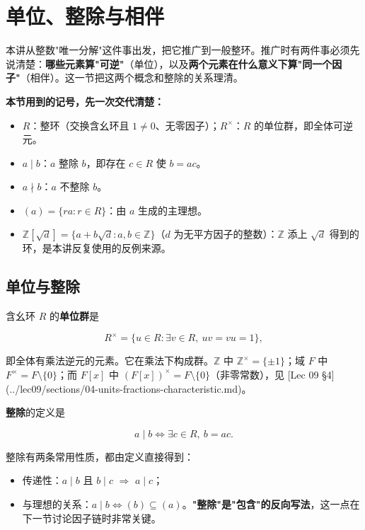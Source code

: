 \section{单位、整除与相伴}


本讲从整数"唯一分解"这件事出发，把它推广到一般整环。推广时有两件事必须先说清楚：\textbf{哪些元素算"可逆"}（单位），以及\textbf{两个元素在什么意义下算"同一个因子"}（相伴）。这一节把这两个概念和整除的关系理清。

\textbf{本节用到的记号，先一次交代清楚：}

\begin{itemize}
\item $R$：整环（交换含幺环且 $1\ne0$、无零因子）；$R^\times$：$R$ 的单位群，即全体可逆元。
\item $a\mid b$：$a$ 整除 $b$，即存在 $c\in R$ 使 $b=ac$。
\item $a\nmid b$：$a$ 不整除 $b$。
\item $(a)=\{ra:r\in R\}$：由 $a$ 生成的主理想。
\item $\mathbb Z[\sqrt{d}]=\{a+b\sqrt{d}:a,b\in\mathbb Z\}$（$d$ 为无平方因子的整数）：$\mathbb Z$ 添上 $\sqrt{d}$ 得到的环，是本讲反复使用的反例来源。
\end{itemize}


\subsection{单位与整除}


含幺环 $R$ 的\textbf{单位群}是

\[
R^\times=\{u\in R:\exists v\in R,\ uv=vu=1\},
\]

即全体有乘法逆元的元素。它在乘法下构成群。$\mathbb Z$ 中 $\mathbb Z^\times=\{\pm1\}$；域 $F$ 中 $F^\times=F\setminus\{0\}$；而 $F[x]$ 中 $(F[x])^\times=F\setminus\{0\}$（非零常数），见 [Lec 09 §4](../lec09/sections/04-units-fractions-characteristic.md)。

\textbf{整除}的定义是

\[
a\mid b\iff \exists c\in R,\ b=ac .
\]

整除有两条常用性质，都由定义直接得到：

\begin{itemize}
\item 传递性：$a\mid b$ 且 $b\mid c$ $\Longrightarrow$ $a\mid c$；
\item 与理想的关系：$a\mid b\iff (b)\subseteq(a)$。\textbf{"整除"是"包含"的反向写法}，这一点在下一节讨论因子链时非常关键。
\end{itemize}


